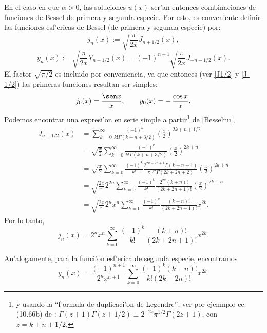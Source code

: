 En el caso en que $\alpha>0$, las soluciones $u(x)$ ser'an entonces combinaciones de funciones de Bessel de primera y segunda especie. Por esto, es conveniente definir las funciones esf'ericas de Bessel (de primera y segunda especie) por:
\begin{equation}
j_{n}(x) := \sqrt{\frac{\pi}{2x}} J_{n+1/2}(x),
\end{equation}
\begin{equation}
y_{n}(x) := \sqrt{\frac{\pi}{2x}} Y_{n+1/2}(x) = (-1)^{n+1} \sqrt{\frac{\pi}{2x}} J_{-n-1/2}(x).
\end{equation}
El factor $\sqrt{\pi/2}$ es incluido por conveniencia, ya que entonces (ver \eqref{J1/2} y \eqref{J-1/2}) las primeras funciones resultan ser simples:
\begin{equation}\label{j0n0}
j_0(x) = \frac{\sen x}{x}, \qquad y_0(x)=-\,\frac{\cos x} {x}.
\end{equation}
Podemos encontrar una expresi'on en serie simple a partir\footnote{y usando la ``f'ormula de duplicaci'on de Legendre'', ver por ejemnplo ec. (10.66b) de \cite{Arfken}: $\Gamma(z+1)\Gamma(z+1/2)\equiv 2^{-2z}\pi^{1/2}\Gamma(2z+1)$, con $z=k+n+1/2$.} de \eqref{Besselnu},
\begin{align}
J_{n+1/2} (x)&= \sum_{k = 0}^\infty \frac{ (-1)^k }{ k! \Gamma(k + n + 3/2) }
\left( \frac{x}{2} \right)^{2k+n+1/2} \\
&=\sqrt{\frac{x}{2}} \sum_{k=0}^\infty \frac{ (-1)^k }{ k! \Gamma(k + n + 3/2) }
\left( \frac{x}{2} \right)^{2k+n} \\
&=\sqrt{\frac{x}{2}} \sum_{k=0}^\infty \frac{ (-1)^k }{ k!}\frac{2^{2k+2n+1}\Gamma(k+n+1)}{\pi^{1/2}\Gamma(2k+2n+2)}
\left( \frac{x}{2} \right)^{2k+n} \\
&=\sqrt{\frac{2x}{\pi}} 2^{2n}\sum_{k=0}^\infty \frac{(-1)^k }{k!}\frac{2^{2k}(k+n)!}{(2k+2n+1)!}\left(\frac{x}{2}\right)^{2k+n} \\
&=\sqrt{\frac{2x}{\pi}} 2^n x^n\sum_{k=0}^\infty \frac{(-1)^k}{k!}\frac{(k+n)!}{(2k+2n+1)!}x^{2k} .
\end{align}
Por lo tanto,
\begin{equation}
\boxed{j_n(x)=2^n x^n\sum_{k=0}^\infty \frac{(-1)^k}{k!}\frac{(k+n)!}{(2k+2n+1)!}x^{2k} .}
\end{equation}

An'alogamente, para la funci'on esf'erica de segunda especie, encontramos
\begin{equation}
\boxed{y_n(x)=\frac{(-1)^{n+1}}{2^nx^{n+1}}\sum_{k=0}^\infty \frac{(-1)^k(k-n)!}{k!(2k-2n)!}x^{2k} .}
\end{equation}

